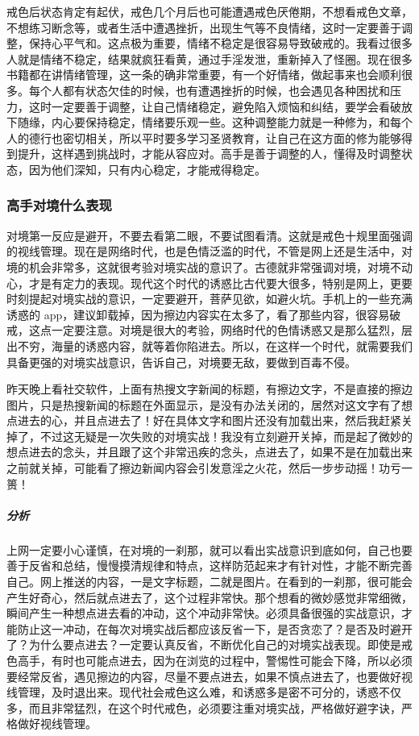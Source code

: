 戒色后状态肯定有起伏，戒色几个月后也可能遭遇戒色厌倦期，不想看戒色文章，不想练习断念等，或者生活中遭遇挫折，出现生气等不良情绪，这时一定要善于调整，保持心平气和。这点极为重要，情绪不稳定是很容易导致破戒的。我看过很多人就是情绪不稳定，结果就疯狂看黄，通过手淫发泄，重新掉入了怪圈。现在很多书籍都在讲情绪管理，这一条的确非常重要，有一个好情绪，做起事来也会顺利很多。每个人都有状态欠佳的时候，也有遭遇挫折的时候，也会遇见各种困扰和压力，这时一定要善于调整，让自己情绪稳定，避免陷入烦恼和纠结，要学会看破放下随缘，内心要保持稳定，情绪要乐观一些。这种调整能力就是一种修为，和每个人的德行也密切相关，所以平时要多学习圣贤教育，让自己在这方面的修为能够得到提升，这样遇到挑战时，才能从容应对。高手是善于调整的人，懂得及时调整状态，因为他们深知，只有内心稳定，才能戒得稳定。

\subsubsection{高手对境什么表现}

对境第一反应是避开，不要去看第二眼，不要试图看清。这就是戒色十规里面强调的视线管理。现在是网络时代，也是色情泛滥的时代，不管是网上还是生活中，对境的机会非常多，这就很考验对境实战的意识了。古德就非常强调对境，对境不动心，才是有定力的表现。现代这个时代的诱惑比古代要大很多，特别是网上，更要时刻提起对境实战的意识，一定要避开，菩萨见欲，如避火坑。手机上的一些充满诱惑的 app，建议卸载掉，因为擦边内容实在太多了，看了那些内容，很容易破戒，这点一定要注意。对境是很大的考验，网络时代的色情诱惑又是那么猛烈，层出不穷，海量的诱惑内容，就等着你陷进去。所以，在这样一个时代，就需要我们具备更强的对境实战意识，告诉自己，对境要无敌，要做到百毒不侵。

\begin{case}
    昨天晚上看社交软件，上面有热搜文字新闻的标题，有擦边文字，不是直接的擦边图片，只是热搜新闻的标题在外面显示，是没有办法关闭的，居然对这文字有了想点进去的心，并且点进去了！好在具体文字和图片还没有加载出来，然后我赶紧关掉了，不过这无疑是一次失败的对境实战！我没有立刻避开关掉，而是起了微妙的想点进去的念头，并且跟了这个非常迅疾的念头，点进去了，如果不是在加载出来之前就关掉，可能看了擦边新闻内容会引发意淫之火花，然后一步步动摇！功亏一篑！
    \subparagraph{分析} 上网一定要小心谨慎，在对境的一刹那，就可以看出实战意识到底如何，自己也要善于反省和总结，慢慢摸清规律和特点，这样防范起来才有针对性，才能不断完善自己。网上推送的内容，一是文字标题，二就是图片。在看到的一刹那，很可能会产生好奇心，然后就点进去了，这个过程非常快。那个想看的微妙感觉非常细微，瞬间产生一种想点进去看的冲动，这个冲动非常快。必须具备很强的实战意识，才能防止这一冲动，在每次对境实战后都应该反省一下，是否贪恋了？是否及时避开了？为什么要点进去？一定要认真反省，不断优化自己的对境实战表现。即使是戒色高手，有时也可能点进去，因为在浏览的过程中，警惕性可能会下降，所以必须要经常反省，遇见擦边的内容，尽量不要点进去，如果不慎点进去了，也要做好视线管理，及时退出来。现代社会戒色这么难，和诱惑多是密不可分的，诱惑不仅多，而且非常猛烈，在这个时代戒色，必须要注重对境实战，严格做好避字诀，严格做好视线管理。
\end{case}

